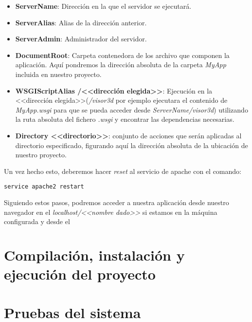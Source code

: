 \begin{itemize}
	\item \textbf{ServerName}: Dirección en la que el servidor se ejecutará.
	\item \textbf{ServerAlias}: Alias de la dirección anterior.
	\item \textbf{ServerAdmin}: Administrador del servidor.
	\item \textbf{DocumentRoot}: Carpeta contenedora de los archivo que componen la aplicación. Aquí pondremos la dirección absoluta de la carpeta \textit{MyApp} incluida en nuestro proyecto.
	\item \textbf{WSGIScriptAlias /<<dirección elegida>>}: Ejecución en la <<dirección elegida>>(\textit{/visor3d} por ejemplo ejecutara el contenido de \textit{MyApp.wsgi} para que se pueda acceder desde \textit{ServerName/visor3d}) utilizando la ruta absoluta del fichero \textit{.wsgi} y encontrar las dependencias necesarias.
	\item \textbf{Directory <<directorio>>}: conjunto de acciones que serán aplicadas al directorio especificado, figurando aquí la dirección absoluta de la ubicación de nuestro proyecto.
\end{itemize}

Un vez hecho esto, deberemos hacer \textit{reset} al servicio de apache con el comando:

\noindent\verb|service apache2 restart|

Siguiendo estos pasos, podremos acceder a nuestra aplicación desde nuestro navegador en el \textit{localhost/<<nombre dado>>} si estamos en la máquina configurada y desde el

\section{Compilación, instalación y ejecución del proyecto}

\section{Pruebas del sistema}
